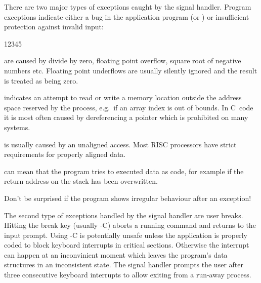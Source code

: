 There are two major types of exceptions caught by the signal handler.
Program exceptions indicate either a bug in the application program
(or \KUIP{}) or insufficient protection against invalid input:
\begin{DL}{12345}
\item[\textem{Floating point exceptions }]
are caused by divide by zero, floating point overflow, square root of negative
numbers etc.
Floating point underflows are usually silently ignored and the result
is treated as being zero.
\item[\textem{Segmentation violation }]
indicates an attempt to read or write a memory location outside the
address space reserved by the process, e.g.\ if an array index is out
of bounds.
In C~code it is most often caused by dereferencing a 
pointer which is prohibited on many systems.
\item[\textem{Bus error }]
is usually caused by an unaligned access.
Most RISC processors have strict requirements for properly aligned data.
\item[\textem{Illegal instruction }]
can mean that the program tries to executed data as code, for example
if the return address on the stack has been overwritten.
\end{DL}
Don't be surprised if the program shows irregular behaviour after an
exception!

The second type of exceptions handled by the \KUIP{} signal handler
are user breaks.
Hitting the break key (usually -C) aborts a running command
and returns to the input prompt.
Using -C is potentially unsafe unless the application is
properly coded to block keyboard interrupts in critical sections.
Otherwise the interrupt can happen at an inconvinient moment which
leaves the program's data structures in an inconsistent state.
The signal handler prompts the user after three consecutive keyboard
interrupts to allow exiting from a run-away process.


